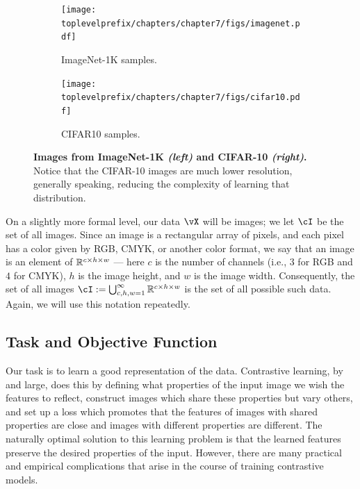 \documentclass[../../book-main.tex]{subfiles}
\begin{document}
\begin{figure}
    \centering
    
    \hfill 
    \begin{subfigure}{0.3\textwidth}
        \centering 
        \texttt{[image: \\toplevelprefix/chapters/chapter7/figs/imagenet.pdf]}
        \caption{\small ImageNet-1K samples.}
    \end{subfigure}
    \hfill 
    \begin{subfigure}{0.26\textwidth}
        \centering 
        \texttt{[image: \\toplevelprefix/chapters/chapter7/figs/cifar10.pdf]}
        \caption{\small CIFAR10 samples.}
    \end{subfigure}
    \hfill 
    \phantom{}

    \caption{\small\textbf{Images from ImageNet-1K \textit{(left)} and CIFAR-10 \textit{(right)}.} Notice that the CIFAR-10 images are much lower resolution, generally speaking, reducing the complexity of learning that distribution.}
    \label{fig:in1k_cifar10_examples}
\end{figure}

On a slightly more formal level, our data \(\vX\) will be images; we let \(\cI\) be the set of all images. Since an image is a rectangular array of pixels, and each pixel has a color given by RGB, CMYK, or another color format, we say that an image is an element of \(\mathbb{R}^{c \times h \times w}\) --- here \(c\) is the number of channels (i.e., \(3\) for RGB and \(4\) for CMYK), \(h\) is the image height, and \(w\) is the image width. Consequently, the set of all images \(\cI := \bigcup_{c, h, w = 1}^{\infty}\R^{c \times h \times w}\) is the set of all possible such data. Again, we will use this notation repeatedly.


\subsection{Task and Objective Function} \label{sub:contrastive_learning_objective}

Our task is to learn a good representation of the data. Contrastive learning, by and large, does this by defining what properties of the input image we wish the features to reflect, construct images which share these properties but vary others, and set up a loss which promotes that the features of images with shared properties are close and images with different properties are different. The naturally optimal solution to this learning problem is that the learned features preserve the desired properties of the input. However, there are many practical and empirical complications that arise in the course of training contrastive models.
\end{document}
